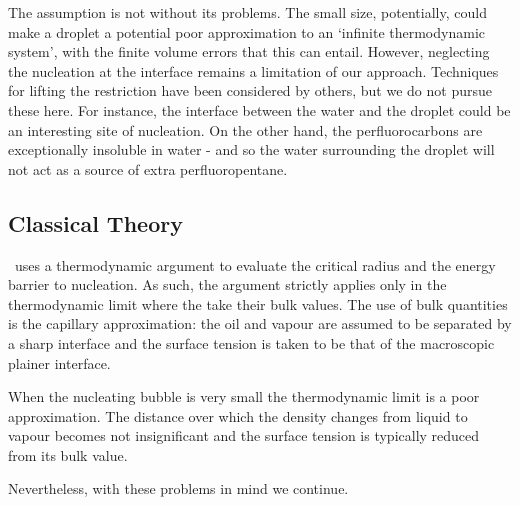 The assumption is not without its problems.
The small size, potentially, could  make a droplet a potential poor approximation to an `infinite thermodynamic system',
with the finite volume errors that this can entail.
However, neglecting the nucleation at the interface remains a limitation of our approach.
Techniques for lifting the restriction have been considered by others\cite{Jarvis1975, Katz1992},
but we do not pursue these here.
For instance, the interface between the water and the droplet could be an interesting site of nucleation.
On the other hand, the perfluorocarbons are exceptionally insoluble in water -
and so the water surrounding the droplet will not act as a source of extra perfluoropentane.


\subsection{Classical Theory}

\Cnt\ uses a thermodynamic argument to evaluate the critical radius and the energy barrier to nucleation.
As such, the argument strictly applies only in the thermodynamic limit
where the  
take their bulk values.
The use of bulk quantities is the capillary approximation:
the oil and vapour are assumed to be separated by a sharp interface and
the surface tension is taken to be that of the macroscopic plainer interface.

When the nucleating bubble is very small the thermodynamic limit is a poor approximation\cite{Talanquer1995}.
The distance over which the density changes from liquid to vapour becomes not insignificant %
and the surface tension is typically reduced from its bulk value\cite{Kiang1971}.

Nevertheless, with these problems in mind we continue.


